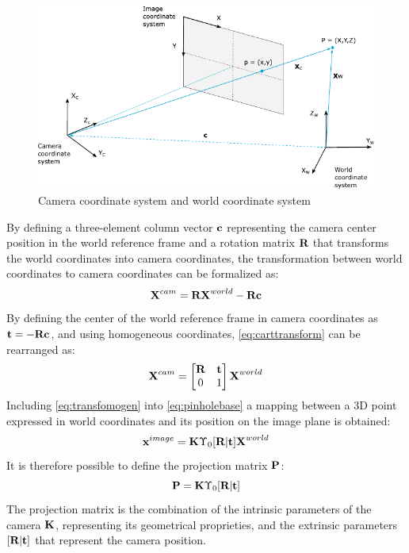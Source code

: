 \begin{figure}[!ht]
    \centering
    \includegraphics[width = 0.85\linewidth]{Images/pinhole2.pdf}
    \caption{Camera coordinate system and world coordinate system}
    \label{fig:pinhole3}
\end{figure}
By defining a three-element column vector $\mathrm{\textbf{c}}$ representing the camera center position in the world reference frame and a rotation matrix $\mathrm{\textbf{R}}$ that transforms the world coordinates into camera coordinates, the transformation between world coordinates to camera coordinates can be formalized as:
\begin{equation}
\label{eq:carttransform}
    \mathrm{\textbf{X}}^{cam} = \mathrm{\textbf{R}}\mathrm{\textbf{X}}^{world} - \mathrm{\textbf{R}}\mathrm{\textbf{c}}
\end{equation}
By defining the center of the world reference frame in camera coordinates as $\mathrm{\textbf{t}} = - \mathrm{\textbf{R}}\mathrm{\textbf{c}}$, and using homogeneous coordinates, \cref{eq:carttransform} can be rearranged as:
\begin{equation}
\label{eq:transfomogen}
    \mathrm{\textbf{X}}^{cam} = \begin{bmatrix}
        \mathrm{\textbf{R}} & \mathrm{\textbf{t}}\\ 0 & 1
    \end{bmatrix}\mathrm{\textbf{X}}^{world}
\end{equation}
Including \cref{eq:transfomogen} into \cref{eq:pinholebase} a mapping between a 3D point expressed in world coordinates and its position on the image plane is obtained:
\begin{equation}
    \mathrm{\textbf{x}}^{image} = \mathrm{\textbf{K}}\Upsilon_0 [\mathrm{\textbf{R}}|\mathrm{\textbf{t}}]\mathrm{\textbf{X}}^{world}
\end{equation}
It is therefore possible to define the projection matrix $\mathrm{\textbf{P}}$:
\begin{equation}
    \mathrm{\textbf{P}} = \mathrm{\textbf{K}}\Upsilon_0 [\mathrm{\textbf{R}}|\mathrm{\textbf{t}}]
\end{equation}
The projection matrix is the combination of the intrinsic parameters of the camera $\mathrm{\textbf{K}}$, representing its geometrical proprieties, and the extrinsic parameters $[\mathrm{\textbf{R}}|\mathrm{\textbf{t}}]$ that represent the camera position.



